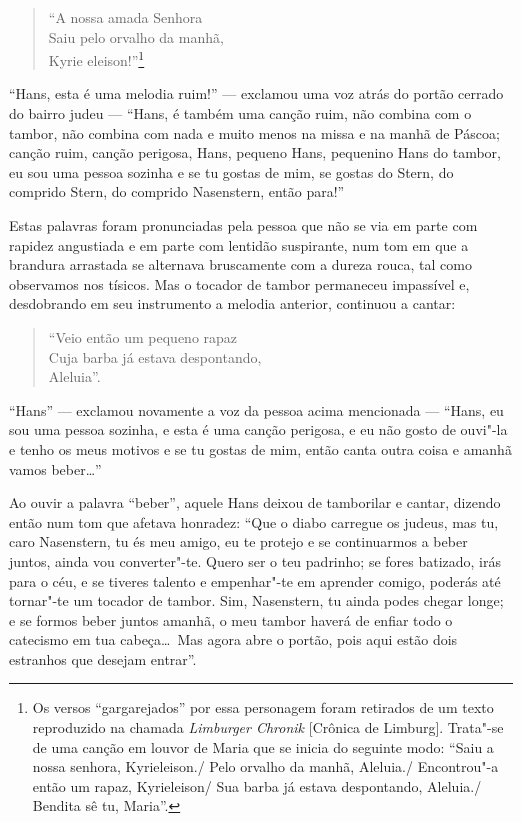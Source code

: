 \begin{verse} 
``A nossa amada Senhora\\
Saiu pelo orvalho da manhã,\\
Kyrie eleison!''\footnote{
Os versos ``gargarejados'' por essa personagem foram retirados de um
texto reproduzido na chamada \textit{Limburger Chronik }[Crônica de
Limburg]. Trata"-se de uma canção em louvor de Maria que se inicia do
seguinte modo: ``Saiu a nossa senhora, Kyrieleison./ Pelo orvalho da
manhã, Aleluia./ Encontrou"-a então um rapaz, Kyrieleison/ Sua barba
já estava despontando, Aleluia./ Bendita sê tu, Maria''.}
\end{verse} 

``Hans, esta é uma melodia ruim!'' --- exclamou uma voz atrás do portão
cerrado do bairro judeu --- ``Hans, é também uma canção ruim, não combina
com o tambor, não combina com nada e muito menos na missa e na manhã de
Páscoa; canção ruim, canção perigosa, Hans, pequeno Hans, pequenino
Hans do tambor, eu sou uma pessoa sozinha e se tu gostas de mim, se
gostas do Stern, do comprido Stern, do comprido Nasenstern, então
para!''

Estas palavras foram pronunciadas pela pessoa que não se via em parte
com rapidez angustiada e em parte com lentidão suspirante, num tom em
que a brandura arrastada se alternava bruscamente com a dureza rouca,
tal como observamos nos tísicos. Mas o tocador de tambor permaneceu
impassível e, desdobrando em seu instrumento a melodia anterior,
continuou a cantar:

\begin{verse} 
``Veio então um pequeno rapaz\\
Cuja barba já estava despontando,\\
Aleluia''.
\end{verse} 

``Hans'' --- exclamou novamente a voz da pessoa acima mencionada --- ``Hans, eu
sou uma pessoa sozinha, e esta é uma canção perigosa, e eu não gosto de
ouvi"-la e tenho os meus motivos e se tu gostas de mim, então canta
outra coisa e amanhã vamos beber\ldots''

Ao ouvir a palavra ``beber'', aquele Hans deixou de tamborilar e cantar,
dizendo então num tom que afetava honradez: ``Que o diabo carregue os
judeus, mas tu, caro Nasenstern, tu és meu amigo, eu te protejo e se
continuarmos a beber juntos, ainda vou converter"-te. Quero ser o teu
padrinho; se fores batizado, irás para o céu, e se tiveres talento e
empenhar"-te em aprender comigo, poderás até tornar"-te um tocador de
tambor. Sim, Nasenstern, tu ainda podes chegar longe; e se formos beber
juntos amanhã, o meu tambor haverá de enfiar todo o catecismo em tua
cabeça\ldots\ Mas agora abre o portão, pois aqui estão dois estranhos que
desejam entrar''.

